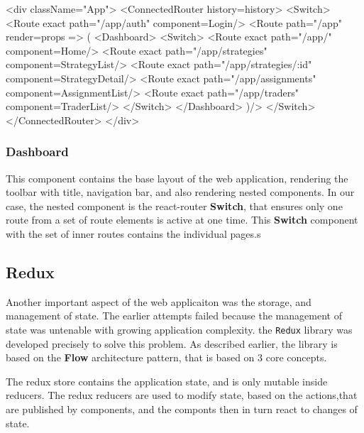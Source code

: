 \begin{code}[language=html,label={react_routing},caption={React application routing JSX}]
<div className="App">
    <ConnectedRouter history={history}>
        <Switch>
            <Route exact path="/app/auth" component={Login}/>
            <Route path="/app" render={props => (
            <Dashboard>
                <Switch>
                    <Route exact path="/app/" component={Home}/>
                    <Route exact path="/app/strategies" component={StrategyList}/>
                    <Route exact path="/app/strategies/:id" component={StrategyDetail}/>
                    <Route exact path="/app/assignments" component={AssignmentList}/>
                    <Route exact path="/app/traders" component={TraderList}/>
                </Switch>
            </Dashboard>
        )}/>
        </Switch>
    </ConnectedRouter>
</div>
\end{code}

\subsubsection{Dashboard}
This component contains the base layout of the web application, rendering the toolbar with title, navigation bar,
and also rendering nested components. In our case, the nested component is the react-router \textbf{Switch},
that ensures only one route from a set of route elements is active at one time. This \textbf{Switch} component
with the set of inner routes contains the individual pages.s

\subsection{Redux}
Another important aspect of the web applicaiton was the storage, and management of state. The earlier attempts failed
because the management of state was untenable with growing application complexity.
the \verb|Redux| library was developed precisely to solve this problem.
As described earlier, the library is based on the \textbf{Flow} architecture pattern, that is based on 3 core concepts.

The redux store contains the application state, and is only mutable inside reducers. The redux reducers are used
to modify state, based on the actions,that are published by components, and the componts then in turn react to
changes of state.


